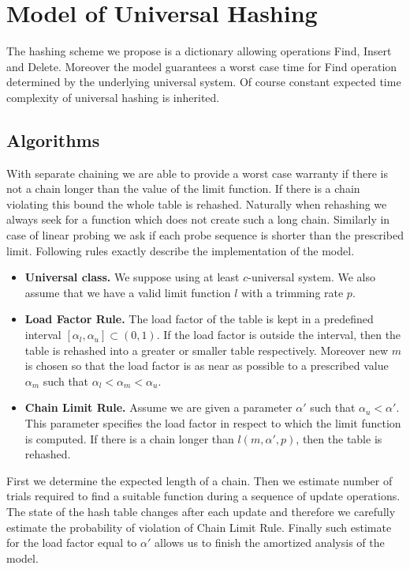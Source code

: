 \section{Model of Universal Hashing}
\label{section-model}
The hashing scheme we propose is a dictionary allowing operations Find, Insert and Delete. Moreover the model guarantees a worst case time for Find operation determined by the underlying universal system. Of course constant expected time complexity of universal hashing is inherited. 

\subsection{Algorithms}
With separate chaining we are able to provide a worst case warranty if there is not a chain longer than the value of the limit function. If there is a chain violating this bound the whole table is rehashed. Naturally when rehashing we always seek for a function which does not create such a long chain. Similarly in case of linear probing we ask if each probe sequence is shorter than the prescribed limit. Following rules exactly describe the implementation of the model.
\begin{itemize}
\item \textbf{Universal class.} We suppose using at least $c$-universal system. We also assume that we have a valid limit function $l$ with a trimming rate $p$.

\item \textbf{Load Factor Rule.} The load factor of the table is kept in a predefined interval $[\alpha_l, \alpha_u] \subset (0, 1)$. If the load factor is outside the interval, then the table is rehashed into a greater or smaller table respectively. Moreover new $m$ is chosen so that the load factor is as near as possible to a prescribed value $\alpha_m$ such that $\alpha_l < \alpha_m < \alpha_u$. 

\item \textbf{Chain Limit Rule.} Assume we are given a parameter $\alpha'$ such that $\alpha_u < \alpha'$. This parameter specifies the load factor in respect to which the limit function is computed. If there is a chain longer than $l(m, \alpha', p)$, then the table is rehashed.
\end{itemize}

First we determine the expected length of a chain. Then we estimate number of trials required to find a suitable function during a sequence of update operations. The state of the hash table changes after each update and therefore we carefully estimate the probability of violation of Chain Limit Rule. Finally such estimate for the load factor equal to $\alpha'$ allows us to finish the amortized analysis of the model.

